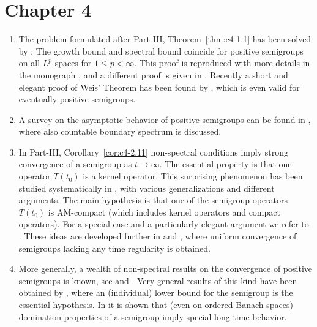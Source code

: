\section*{Chapter 4}
\begin{enumerate}
\item 
The problem formulated after Part-III, Theorem~\ref{thm:c4-1.1} has been solved by \textcite{zbmath00868262}:
The growth bound and spectral bound coincide for positive semigroups on all $L^{p}$-spaces  for $1 \leq p < \infty$. 
This proof is reproduced with more details in the monograph \textcite{zbmath00921898}, and a different proof is given in \textcite[Theorem 5.3.6]{zbmath05842872}.  
Recently a short and elegant proof of Weis' Theorem has been found by \textcite{zbmath07574448}, which is even valid for eventually positive semigroups.

\item 
A survey on the asymptotic behavior of positive semigroups can be found in \textcite{mr4176382}, where also countable boundary spectrum is discussed.


\item 
In Part-III, Corollary~\ref{cor:c4-2.11} non-spectral conditions imply strong convergence of a semigroup as $t \rightarrow \infty$. 
The essential property is that one operator $T(t_0)$ is a kernel operator. 
This surprising phenomenon has been studied systematically in \textcite{zbmath07124949}, with various generalizations and different arguments. 
The main hypothesis is that one of the semigroup operators $T(t_0)$ is AM-compact (which includes kernel operators and compact operators). 
For a special case and a particularly elegant argument we refer to \textcite{zbmath06790441}.
These ideas are developed further in \textcite{zbmath07201923} and \textcite{zbmath07452698}, where uniform convergence of semigroups lacking any time regularity is obtained.

\item 
 More generally, a wealth of non-spectral results on the convergence of positive semigroups is known, see \eg \textcite{zbmath00482883}  and \textcite{zbmath05080033}. 
 Very general results of this kind have been obtained by \textcite{zbmath06971625}, where an (individual) lower bound for the semigroup is the essential hypothesis.
In \textcite{zbmath07118395} it is shown that (even on ordered Banach spaces) domination properties of a semigroup imply special long-time behavior.


\end{enumerate}
